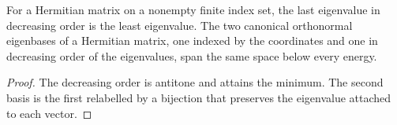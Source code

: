 \begin{theorem}
    \label{thm:canonical_spectral_span}
    \leanok
    For a Hermitian matrix on a nonempty finite index set, the last eigenvalue
    in decreasing order is the least eigenvalue. The two canonical orthonormal
    eigenbases of a Hermitian matrix, one indexed by the coordinates and one in
    decreasing order of the eigenvalues, span the same space below every energy.
\end{theorem}
\begin{proof}\leanok
    The decreasing order is antitone and attains the minimum. The second basis is
    the first relabelled by a bijection that preserves the eigenvalue attached to
    each vector.
\end{proof}

